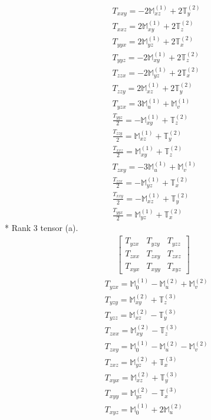 \documentclass[fleqn,8pt,landscape]{jsarticle}
\begin{document}
\begin{align*}
& T_{xxy} = - 2 \mathbb{M}_{xz}^{(1)} + 2 \mathbb{T}_{y}^{(2)} \\
& T_{xxz} = 2 \mathbb{M}_{xy}^{(1)} + 2 \mathbb{T}_{z}^{(2)} \\
& T_{yyx} = 2 \mathbb{M}_{yz}^{(1)} + 2 \mathbb{T}_{x}^{(2)} \\
& T_{yyz} = - 2 \mathbb{M}_{xy}^{(1)} + 2 \mathbb{T}_{z}^{(2)} \\
& T_{zzx} = - 2 \mathbb{M}_{yz}^{(1)} + 2 \mathbb{T}_{x}^{(2)} \\
& T_{zzy} = 2 \mathbb{M}_{xz}^{(1)} + 2 \mathbb{T}_{y}^{(2)} \\
& T_{yzx} = 3 \mathbb{M}_{u}^{(1)} + \mathbb{M}_{v}^{(1)} \\
& \frac{T_{yyz}}{2} = - \mathbb{M}_{xy}^{(1)} + \mathbb{T}_{z}^{(2)} \\
& \frac{T_{zzy}}{2} = \mathbb{M}_{xz}^{(1)} + \mathbb{T}_{y}^{(2)} \\
& \frac{T_{xxz}}{2} = \mathbb{M}_{xy}^{(1)} + \mathbb{T}_{z}^{(2)} \\
& T_{zxy} = - 3 \mathbb{M}_{u}^{(1)} + \mathbb{M}_{v}^{(1)} \\
& \frac{T_{zzx}}{2} = - \mathbb{M}_{yz}^{(1)} + \mathbb{T}_{x}^{(2)} \\
& \frac{T_{xxy}}{2} = - \mathbb{M}_{xz}^{(1)} + \mathbb{T}_{y}^{(2)} \\
& \frac{T_{yyx}}{2} = \mathbb{M}_{yz}^{(1)} + \mathbb{T}_{x}^{(2)}
\end{align*}
* Rank 3 tensor (a).
\begin{align*}
\begin{bmatrix} T_{yzx} & T_{yzy} & T_{yzz} \\ T_{zxx} & T_{zxy} & T_{zxz} \\ T_{xyx} & T_{xyy} & T_{xyz} \end{bmatrix}
\end{align*}
\begin{align*}
& T_{yzx} = \mathbb{M}_{0}^{(1)} - \mathbb{M}_{u}^{(2)} + \mathbb{M}_{v}^{(2)} \\
& T_{yzy} = \mathbb{M}_{xy}^{(2)} + \mathbb{T}_{z}^{(3)} \\
& T_{yzz} = \mathbb{M}_{xz}^{(2)} - \mathbb{T}_{y}^{(3)} \\
& T_{zxx} = \mathbb{M}_{xy}^{(2)} - \mathbb{T}_{z}^{(3)} \\
& T_{zxy} = \mathbb{M}_{0}^{(1)} - \mathbb{M}_{u}^{(2)} - \mathbb{M}_{v}^{(2)} \\
& T_{zxz} = \mathbb{M}_{yz}^{(2)} + \mathbb{T}_{x}^{(3)} \\
& T_{xyx} = \mathbb{M}_{xz}^{(2)} + \mathbb{T}_{y}^{(3)} \\
& T_{xyy} = \mathbb{M}_{yz}^{(2)} - \mathbb{T}_{x}^{(3)} \\
& T_{xyz} = \mathbb{M}_{0}^{(1)} + 2 \mathbb{M}_{u}^{(2)}
\end{align*}
\end{document}
